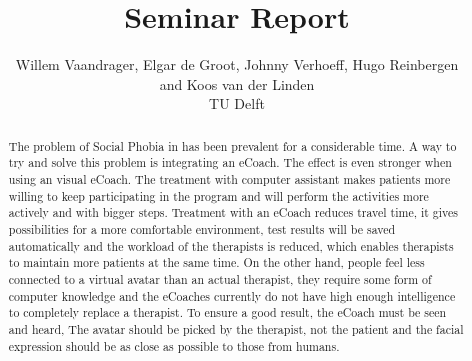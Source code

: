 \documentclass[twoside]{article}
\title{\vspace{-15mm}\fontsize{24pt}{10pt}\selectfont\textbf{Seminar Report}} %
\author{Willem Vaandrager, Elgar de Groot, Johnny Verhoeff, Hugo Reinbergen\\
 and Koos van der Linden 
\textsc{}\\[2mm]
\normalsize TU Delft \\ 
\vspace{-5mm}
}
\date{}
\begin{document}
\maketitle %

\thispagestyle{fancy} %


\begin{abstract}

The problem of Social Phobia in has been prevalent for a considerable time. A way to try and solve this problem is integrating an eCoach. The effect is even stronger when using an visual eCoach. The treatment with computer assistant makes patients more willing to keep participating in the program and will perform the activities more actively and with bigger steps.
 Treatment with an eCoach reduces travel time, it gives possibilities for a more comfortable environment, test results will be saved automatically and the workload of the therapists is reduced, which enables therapists to maintain more patients at the same time.
On the other hand, people feel less connected to a virtual avatar than an actual therapist, they require some form of computer knowledge and the eCoaches currently do not have high enough intelligence to completely replace a therapist.
To ensure a good result, the eCoach must be seen and heard, The avatar should be picked by the therapist, not the patient and the facial expression should be as close as possible to those from humans.

\end{abstract}

\end{document}
